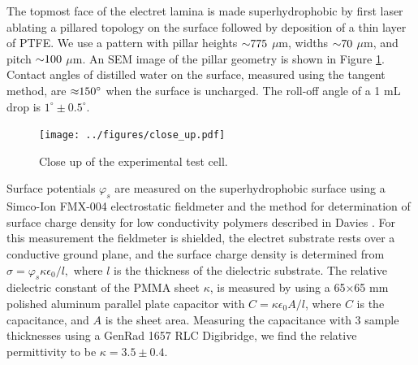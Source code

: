 \documentclass[aip,reprint, floatfix]{revtex4-1}
\begin{document}
The topmost face of the electret lamina is made superhydrophobic by first laser ablating a pillared topology  on the surface followed by deposition of a thin layer of PTFE. We use a pattern with pillar heights $\sim \hspace{-1mm} 775$ $\mu$m, widths $\sim \hspace{-1mm} 70$ $\mu$m, and pitch $\sim \hspace{-1mm} 100$ $\mu$m. An SEM image of the pillar geometry is shown in Figure \ref{fig:SEM}. Contact angles of distilled water on the surface, measured using the tangent method, are $\approx \hspace{-1mm} 150^{\circ}$ when the surface is uncharged. The roll-off angle of a 1 mL drop is $1^{\circ} \pm 0.5^{\circ}$.

\begin{figure}
    \centering
    \def\svgwidth{\columnwidth}
        \texttt{[image: ../figures/close\_up.pdf]}
    \caption{Close up of the experimental test cell.\label{fig:SEM}}
\end{figure}

Surface potentials $\varphi_s$ are measured on the superhydrophobic surface using a Simco-Ion FMX-004 electrostatic fieldmeter and the method for determination of surface charge density for low conductivity polymers described in Davies \cite{davies_examination_1967}. For this measurement the fieldmeter is shielded, the electret substrate rests over a conductive ground plane, and the surface charge density is determined from $\sigma = \varphi_s \kappa \epsilon_0/l,$ where $l$ is the thickness of the dielectric substrate. The relative dielectric constant of the PMMA sheet $\kappa$, is measured by using a 65$\times$65 mm polished aluminum parallel plate capacitor with $C = \kappa \epsilon_0 A/l$, where $C$ is the capacitance, and $A$ is the sheet area. Measuring the capacitance with 3 sample thicknesses using a GenRad 1657 RLC Digibridge, we find the relative permittivity to be $\kappa = 3.5 \pm 0.4$.  
\end{document}
